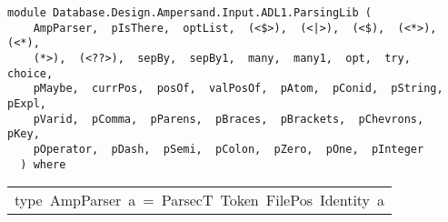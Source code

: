 \label{module:Database.Design.Ampersand.Input.ADL1.ParsingLib}
\haddockbeginheader
{\haddockverb\begin{verbatim}
module Database.Design.Ampersand.Input.ADL1.ParsingLib (
    AmpParser,  pIsThere,  optList,  (<$>),  (<|>),  (<$),  (<*>),  (<*), 
    (*>),  (<??>),  sepBy,  sepBy1,  many,  many1,  opt,  try,  choice, 
    pMaybe,  currPos,  posOf,  valPosOf,  pAtom,  pConid,  pString,  pExpl, 
    pVarid,  pComma,  pParens,  pBraces,  pBrackets,  pChevrons,  pKey, 
    pOperator,  pDash,  pSemi,  pColon,  pZero,  pOne,  pInteger
  ) where\end{verbatim}}
\haddockendheader

\begin{haddockdesc}
\item[\begin{tabular}{@{}l}
type\ AmpParser\ a\ =\ ParsecT\ {\char 91}Token{\char 93}\ FilePos\ Identity\ a
\end{tabular}]
\end{haddockdesc}
